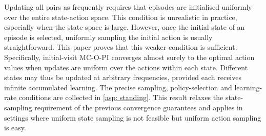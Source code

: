 

Updating all pairs as frequently requires that episodes are initialised uniformly over the entire state-action space.
This condition is unrealistic in practice, especially when the state space is large.
However, once the initial state of an episode is selected, uniformly sampling the initial action is usually straightforward.
This paper proves that this weaker condition is sufficient.
Specifically, initial-visit MC-O-PI converges almost surely to the optimal action values when updates are uniform over the actions within each state.
Different states may thus be updated at arbitrary frequencies, provided each receives infinite accumulated learning. The precise sampling, policy-selection and learning-rate conditions are collected in \autoref{asp: standing}.
This result relaxes the state-sampling requirement of the previous convergence guarantees
and applies in settings where uniform state sampling is not feasible but uniform action sampling is easy.


